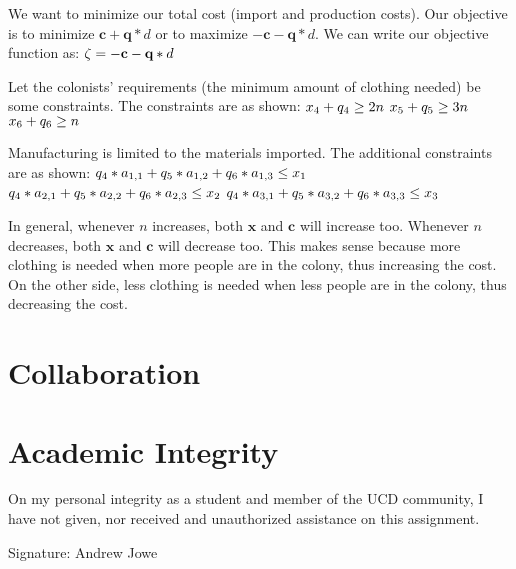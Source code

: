 \documentclass[17pt]{extarticle}
\begin{document}
\bigskip We want to minimize our total cost (import and production costs). Our objective is to minimize $\textbf{c}+\textbf{q}*d$ or to maximize $-\textbf{c}-\textbf{q}*d$. We can write our objective function as:
$\\\zeta = -\textbf{c}-\textbf{q}*d$

\bigskip Let the colonists' requirements (the minimum amount of clothing needed) be some constraints. The constraints are as shown:
$\\x_4 + q_4 \geq 2n$
$\\x_5 + q_5 \geq 3n$
$\\x_6 + q_6 \geq n$

\bigskip Manufacturing is limited to the materials imported. The additional constraints are as shown:
$\\q_4*a_{1,1} + q_5*a_{1,2} + q_6*a_{1,3} \leq x_1$
$\\q_4*a_{2,1} + q_5*a_{2,2} + q_6*a_{2,3} \leq x_2$
$\\q_4*a_{3,1} + q_5*a_{3,2} + q_6*a_{3,3} \leq x_3$

\bigskip In general, whenever $n$ increases, both $\textbf{x}$ and $\textbf{c}$ will increase too. Whenever $n$ decreases, both $\textbf{x}$ and $\textbf{c}$ will decrease too. This makes sense because more clothing is needed when more people are in the colony, thus increasing the cost. On the other side, less clothing is needed when less people are in the colony, thus decreasing the cost.

\newpage
\section*{Collaboration}

\newpage
\section*{Academic Integrity}
On my personal integrity as a student and member of the UCD community, I have not given, nor received and unauthorized assistance on this assignment.

Signature: Andrew Jowe
\end{document}
